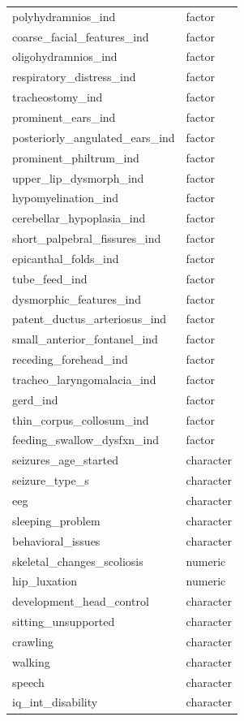 \documentclass[
  authoryear,
  preprint,
  3p]{elsarticle}
\begin{document}
\begin{longtable}{ll}
polyhydramnios\_ind & factor \\ 
coarse\_facial\_features\_ind & factor \\ 
oligohydramnios\_ind & factor \\ 
respiratory\_distress\_ind & factor \\ 
tracheostomy\_ind & factor \\ 
prominent\_ears\_ind & factor \\ 
posteriorly\_angulated\_ears\_ind & factor \\ 
prominent\_philtrum\_ind & factor \\ 
upper\_lip\_dysmorph\_ind & factor \\ 
hypomyelination\_ind & factor \\ 
cerebellar\_hypoplasia\_ind & factor \\ 
short\_palpebral\_fissures\_ind & factor \\ 
epicanthal\_folds\_ind & factor \\ 
tube\_feed\_ind & factor \\ 
dysmorphic\_features\_ind & factor \\ 
patent\_ductus\_arteriosus\_ind & factor \\ 
small\_anterior\_fontanel\_ind & factor \\ 
receding\_forehead\_ind & factor \\ 
tracheo\_laryngomalacia\_ind & factor \\ 
gerd\_ind & factor \\ 
thin\_corpus\_collosum\_ind & factor \\ 
feeding\_swallow\_dysfxn\_ind & factor \\ 
seizures\_age\_started & character \\ 
seizure\_type\_s & character \\ 
eeg & character \\ 
sleeping\_problem & character \\ 
behavioral\_issues & character \\ 
skeletal\_changes\_scoliosis & numeric \\ 
hip\_luxation & numeric \\ 
development\_head\_control & character \\ 
sitting\_unsupported & character \\ 
crawling & character \\ 
walking & character \\ 
speech & character \\ 
iq\_int\_disability & character \\ 

\end{longtable}
\end{document}
